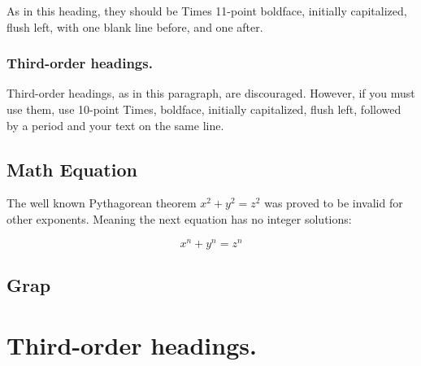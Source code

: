 \documentclass[10pt]{article}
\begin{document}
As in this heading, they should be Times 11-point boldface, initially capitalized, flush left, with one blank line before, and one after. 

\subsubsection{Third-order headings. }

Third-order headings, as in this paragraph, are discouraged. However, if you must use them, use 10-point Times, boldface, initially capitalized, flush left, followed by a period and your text on the same line. 


\subsection{Math Equation}
The well known Pythagorean theorem \(x^2 + y^2 = z^2\) was 
proved to be invalid for other exponents. 
Meaning the next equation has no integer solutions:

\[ x^n + y^n = z^n \]


\subsection{Grap}
\section{Third-order headings. }
\end{document}
